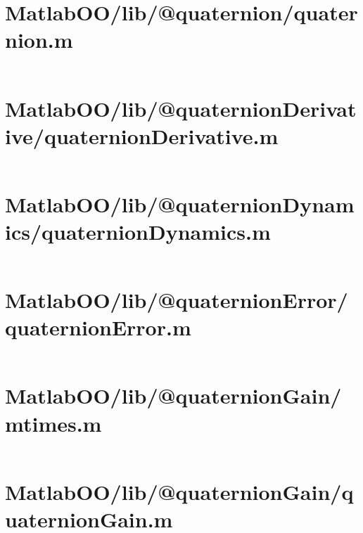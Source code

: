 \pagebreak
\section{MatlabOO/lib/@quaternion/quaternion.m}\label{code:MatlabOO/lib/@quaternion/quaternion.m}
\inputminted[linenos,fontsize=\scriptsize]{matlab}{/home/dcouture/git/mathyourlife/TSatPy/beta_versions/matlab_object_oriented/lib/@quaternion/quaternion.m}

\pagebreak
\section{MatlabOO/lib/@quaternionDerivative/quaternionDerivative.m}\label{code:MatlabOO/lib/@quaternionDerivative/quaternionDerivative.m}
\inputminted[linenos,fontsize=\scriptsize]{matlab}{/home/dcouture/git/mathyourlife/TSatPy/beta_versions/matlab_object_oriented/lib/@quaternionDerivative/quaternionDerivative.m}

\pagebreak
\section{MatlabOO/lib/@quaternionDynamics/quaternionDynamics.m}\label{code:MatlabOO/lib/@quaternionDynamics/quaternionDynamics.m}
\inputminted[linenos,fontsize=\scriptsize]{matlab}{/home/dcouture/git/mathyourlife/TSatPy/beta_versions/matlab_object_oriented/lib/@quaternionDynamics/quaternionDynamics.m}

\pagebreak
\section{MatlabOO/lib/@quaternionError/quaternionError.m}\label{code:MatlabOO/lib/@quaternionError/quaternionError.m}
\inputminted[linenos,fontsize=\scriptsize]{matlab}{/home/dcouture/git/mathyourlife/TSatPy/beta_versions/matlab_object_oriented/lib/@quaternionError/quaternionError.m}

\pagebreak
\section{MatlabOO/lib/@quaternionGain/mtimes.m}\label{code:MatlabOO/lib/@quaternionGain/mtimes.m}
\inputminted[linenos,fontsize=\scriptsize]{matlab}{/home/dcouture/git/mathyourlife/TSatPy/beta_versions/matlab_object_oriented/lib/@quaternionGain/mtimes.m}

\pagebreak
\section{MatlabOO/lib/@quaternionGain/quaternionGain.m}\label{code:MatlabOO/lib/@quaternionGain/quaternionGain.m}
\inputminted[linenos,fontsize=\scriptsize]{matlab}{/home/dcouture/git/mathyourlife/TSatPy/beta_versions/matlab_object_oriented/lib/@quaternionGain/quaternionGain.m}

